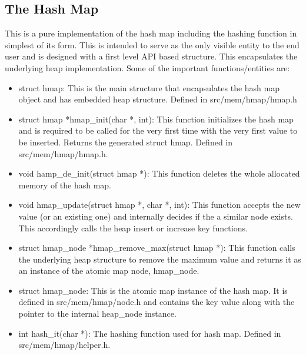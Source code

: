 \documentclass[conference,a4paper,12pt]{IEEEtran}
\begin{document}
	\subsection{The Hash Map}
	This is a pure implementation of the hash map including the hashing function in simplest of its form. This is intended to serve as the only visible entity to the end user and is designed with a first level API based structure. This encapsulates the underlying heap implementation. Some of the important functions/entities are:
	\begin{itemize}
	\item{struct hmap:}
	This is the main structure that encapsulates the hash map object and has embedded heap structure. Defined in src/mem/hmap/hmap.h
	\item{struct hmap *hmap\_init(char *, int):}
	This function initializes the hash map and is required to be called for the very first time with the very first value to be inserted. Returns the generated struct hmap. Defined in src/mem/hmap/hmap.h.
	\item{void hamp\_de\_init(struct hmap *):}
	This function deletes the whole allocated memory of the hash map.
	\item{void  hmap\_update(struct hmap *, char *, int):}
	This function accepts the new value (or an existing one) and internally decides if the a similar node exists. This accordingly calls the heap insert or increase key functions.
	\item{struct hmap\_node *hmap\_remove\_max(struct hmap *):}
	This function calls the underlying heap structure to remove the maximum value and returns it as an instance of the atomic map node, hmap\_node.
	\item{struct hmap\_node:}
	This is the atomic map instance of the hash map. It is defined in src/mem/hmap/node.h and contains the key value along with the pointer to the internal heap\_node instance.
	\item{int hash\_it(char *):}
	The hashing function used for hash map. Defined in src/mem/hmap/helper.h.
	\end{itemize}
	
\end{document}
